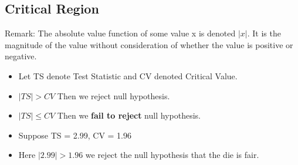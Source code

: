 \documentclass[a4paper,12pt]{article}
\begin{document}

\subsection*{Critical Region }
	
	Remark: The absolute value function of some value x is denoted $|x|$. It is the magnitude of the value without consideration of whether the value is positive or negative.
	
	
	\begin{itemize}
		\item Let TS denote Test Statistic and CV denoted Critical Value.
		\item $|TS| > CV$ Then we reject null hypothesis.
		\item $|TS| \leq CV$ Then we \textbf{fail to reject} null hypothesis.
		\item Suppose TS = 2.99, CV = 1.96
		\item Here $|2.99| > 1.96$ we reject the null hypothesis that the die is fair.
	\end{itemize}

%
%

\end{document}
